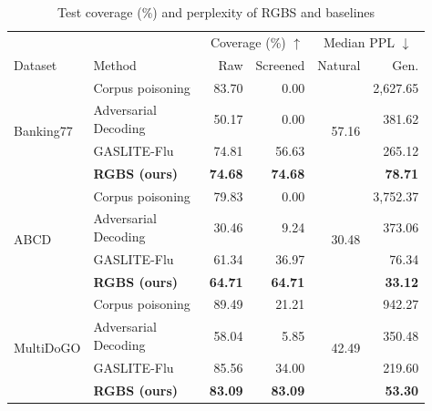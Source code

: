 \begin{table}[!htb]
\caption{Test coverage (\%) and perplexity of RGBS and baselines}
\label{tab:external-generation}
\centering\footnotesize
\setlength{\tabcolsep}{1.5pt}
\renewcommand{\arraystretch}{1.00}
\begin{tabular*}{\columnwidth}{@{\extracolsep{\fill}}llrrrr@{}}
\toprule
& & \multicolumn{2}{c}{Coverage (\%) $\uparrow$} & \multicolumn{2}{c}{Median PPL $\downarrow$} \\
\cmidrule(lr){3-4}\cmidrule(l){5-6}
Dataset & Method & Raw & Screened & Natural & Gen. \\
\midrule
\multirow{4}{*}{Banking77} & Corpus poisoning~\cite{zhong2023corpuspoisoning} & 83.70 & 0.00 & \multirow{4}{*}{57.16} & 2,627.65 \\
 & \shortstack[l]{Adversarial\\Decoding~\cite{zhang2025adversarialdecoding}} & 50.17 & 0.00 &  & 381.62 \\
 & GASLITE-Flu~\cite{bentov2025gaslite} & 74.81 & 56.63 &  & 265.12 \\
 & \textbf{RGBS (ours)} & \textbf{74.68} & \textbf{74.68} &  & \textbf{78.71} \\
\midrule
\multirow{4}{*}{ABCD} & Corpus poisoning~\cite{zhong2023corpuspoisoning} & 79.83 & 0.00 & \multirow{4}{*}{30.48} & 3,752.37 \\
 & \shortstack[l]{Adversarial\\Decoding~\cite{zhang2025adversarialdecoding}} & 30.46 & 9.24 &  & 373.06 \\
 & GASLITE-Flu~\cite{bentov2025gaslite} & 61.34 & 36.97 &  & 76.34 \\
 & \textbf{RGBS (ours)} & \textbf{64.71} & \textbf{64.71} &  & \textbf{33.12} \\
\midrule
\multirow{4}{*}{MultiDoGO} & Corpus poisoning~\cite{zhong2023corpuspoisoning} & 89.49 & 21.21 & \multirow{4}{*}{42.49} & 942.27 \\
 & \shortstack[l]{Adversarial\\Decoding~\cite{zhang2025adversarialdecoding}} & 58.04 & 5.85 &  & 350.48 \\
 & GASLITE-Flu~\cite{bentov2025gaslite} & 85.56 & 34.00 &  & 219.60 \\
 & \textbf{RGBS (ours)} & \textbf{83.09} & \textbf{83.09} &  & \textbf{53.30} \\
\bottomrule
\end{tabular*}
\end{table}
